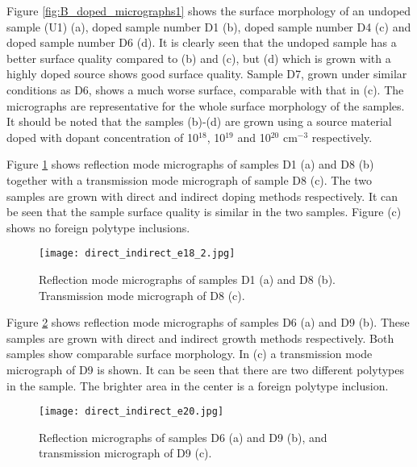 Figure \ref{fig:B_doped_micrographs1} shows the surface morphology of an undoped sample (U1) (a), doped sample number D1 (b), doped sample number D4 (c) and doped sample number D6 (d). It is clearly seen that the undoped sample has a better surface quality compared to (b) and (c), but (d) which is grown with a highly doped source shows good surface quality. Sample D7, grown under similar conditions as D6, shows a much worse surface, comparable with that in (c). The micrographs are representative for the whole surface morphology of the samples. It should be noted that the samples (b)-(d)   are grown using a source material doped with dopant concentration of 10$^{18}$, 10$^{19}$ and 10$^{20}$ cm$^{-3}$ respectively.

Figure \ref{fig:B_doped_micrographs2} shows reflection mode micrographs of samples D1 (a) and D8 (b) together with a transmission mode micrograph of sample D8 (c). The two samples are grown with direct and indirect doping methods respectively. It can be seen that the sample surface quality is similar in the two samples. Figure (c) shows no foreign polytype inclusions. 

\begin{figure}[h]
\begin{center}
\texttt{[image: direct\_indirect\_e18\_2.jpg]}
\caption{Reflection mode micrographs of samples D1 (a) and D8 (b). Transmission mode micrograph of D8 (c). 
\label{fig:B_doped_micrographs2}}
\end{center}
\end{figure}


Figure \ref{fig:BGe20_micrograph} shows reflection mode micrographs of samples D6 (a) and D9 (b). These samples are grown with direct and indirect growth methods respectively. Both samples show comparable surface morphology. In (c) a transmission mode micrograph of D9 is shown. It can be seen that there are two different polytypes in the sample. The brighter area in the center is a foreign polytype inclusion. 

\begin{figure}[h]
\begin{center}
\texttt{[image: direct\_indirect\_e20.jpg]}
\caption{Reflection micrographs of samples D6 (a) and D9 (b), and transmission micrograph of D9 (c). 
\label{fig:BGe20_micrograph}}
\end{center}
\end{figure}



